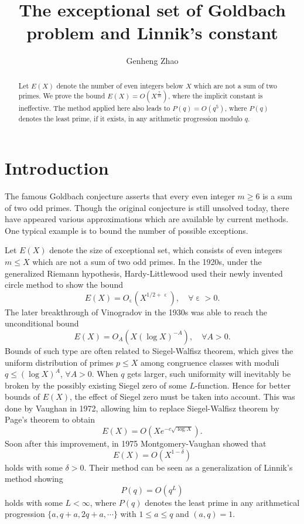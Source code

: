 \documentclass[10pt, reqno]{amsart}
\title{The exceptional set of Goldbach problem and Linnik's constant}
\author{Genheng Zhao}
\numberwithin{equation}{section}
\renewcommand{\epsilon }{\operatorname{\varepsilon}}
\begin{document}
\maketitle

\begin{abstract}
Let $E(X)$ denote the number of even integers below $X$ which are not a sum of two primes. We prove the bound $E(X)=O(X^{\frac{7}{10}})$, where the implicit constant is ineffective. The method applied here also leads to $P(q)=O(q^5)$, where $P(q)$ denotes the least prime, if it exists, in any arithmetic progression modulo $q$.
\end{abstract}

\section{Introduction}
The famous Goldbach conjecture asserts that every even integer $m \geq 6$ is a sum of two odd primes. Though the original conjecture is still unsolved today, there have appeared various approximations which are available by current methods. One typical example is to bound the number of possible exceptions.

Let $E(X)$ denote the size of exceptional set, which consists of even integers $m\leq X$ which are not a sum of two odd primes. In the 1920s, under the generalized Riemann hypothesis, Hardy-Littlewood \cite{Hardy-Littlewood} used their newly invented circle method to show the bound
\begin{equation}\label{eq:HardyLittlewood}
E(X)=O_{\epsilon}(X^{1/2+\epsilon}),\quad \forall \epsilon>0.
\end{equation}
The later breakthrough of Vinogradov \cite{Vinogradov} in the 1930s was able to reach the unconditional bound
\begin{equation}\label{eq:Vinogradov}
E(X)=O_A(X(\log X)^{-A}), \quad \forall A>0.
\end{equation}
Bounds of such type are often related to Siegel-Walfisz theorem, which gives the uniform distribution of primes $p\leq X$ among congruence classes with moduli $q\leq (\log X)^A$, $\forall A>0$. When $q$ gets larger, such  uniformity will  inevitably be broken by the possibly existing Siegel zero of some $L$-function. Hence for better bounds of $E(X)$, the effect of Siegel zero must be taken into account. This was done by Vaughan in 1972, allowing him to replace Siegel-Walfisz theorem by Page's theorem to obtain
\begin{equation}\label{eq:Vaughan}
E(X)=O(Xe^{-c\sqrt{\log X}}).
\end{equation}
Soon after this improvement, in 1975 Montgomery-Vaughan \cite{Montgomery-Vaughan} showed that
\begin{equation}\label{eq:MontgomeryVaughan}
E(X)=O(X^{1-\delta})
\end{equation}
holds with some $\delta>0$. Their method  can be seen as a generalization of Linnik's method \cite{Linnik} showing
\begin{equation}\label{eq:Linnik}
P(q)=O(q^L)
\end{equation}
holds with some $L<\infty$, where $P(q)$ denotes the least prime in any arithmetical progression $\{a,q+a,2q+a,\cdots\}$ with $1\leq a\leq q$ and $(a,q)=1$.
\end{document}
